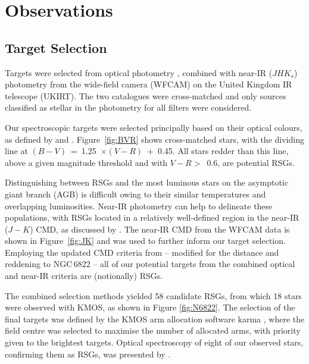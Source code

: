 
\section{Observations}
\label{sec:ngc6822obs}

\subsection{Target Selection} %
\label{sub:target_selection}

Targets were selected from optical photometry
\citep{2007AJ....134.2474M}, combined with near-IR ($JHK{_s}$) photometry
\cite[for details see][]{2012A&A...540A.135S} from the wide-field camera (WFCAM) on the United Kingdom IR telescope (UKIRT).
The two catalogues were cross-matched and only sources classified as stellar in the photometry for all filters were considered.

Our spectroscopic targets were selected principally based on their optical colours, as defined by
\cite{1998ApJ...501..153M} and
\cite{2012AJ....144....2L}.
Figure~\ref{fig:BVR} shows cross-matched stars, with the dividing line at
$(B-V)$~=~1.25~$\times (V-R)$~+~0.45.
All stars redder than this line, above a given magnitude threshold and with
$V-R >$~0.6, are potential RSGs.

Distinguishing between RSGs and the most luminous stars on the asymptotic giant branch
(AGB) is difficult owing to their similar temperatures and overlapping luminosities.
Near-IR photometry can help to delineate these populations,
with RSGs located in a relatively well-defined region in the near-IR ($J-K$) CMD, as discussed by
\cite{2000ApJ...542..804N}.
The near-IR CMD from the WFCAM data is shown in
Figure~\ref{fig:JK} and was used to further inform our target selection.
Employing the updated CMD criteria from
\cite{2014A&A...562A..32C}  -- modified for the distance and reddening to NGC\,6822 --
all of our potential targets from the combined optical and near-IR criteria are (notionally) RSGs.


The combined selection methods yielded 58 candidate RSGs, from which 18 stars were observed with KMOS, as shown in Figure
\ref{fig:N6822}.
The selection of the final targets was defined by the KMOS arm allocation software {\sc karma}
\citep{2008SPIE.7019E..0TW},
where the field centre was selected to maximise the number of allocated arms,
with priority given to the brightest targets.
Optical spectroscopy of eight of our observed stars, confirming them as RSGs, was presented by
\cite{2012AJ....144....2L}.


